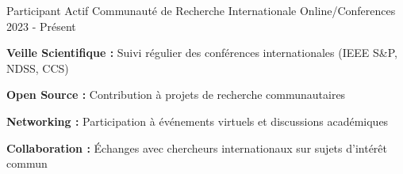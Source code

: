 \begin{cventries}
    \cventry
    {Participant Actif}
    {Communauté de Recherche Internationale} %
    {Online/Conferences} %
    {2023 - Présent} %
    {
        \begin{cvitems} %
            \item {\textbf{Veille Scientifique :} Suivi régulier des conférences internationales (IEEE S\&P, NDSS, CCS)}
            \item {\textbf{Open Source :} Contribution à projets de recherche communautaires}
            \item {\textbf{Networking :} Participation à événements virtuels et discussions académiques}
            \item {\textbf{Collaboration :} Échanges avec chercheurs internationaux sur sujets d'intérêt commun}
        \end{cvitems}
    }

\end{cventries}